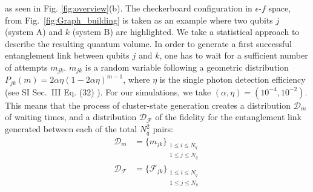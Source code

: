 \documentclass[%
 reprint,
 superscriptaddress,
 amsmath,amssymb,
 aps,
 prx,
]{revtex4-2}
\begin{document}
as seen in Fig. \ref{fig:overview}(b). The checkerboard configuration in $\epsilon$-$f$ space, from Fig.~\ref{fig:Graph_building} is taken as an example where two qubits $j$ (system A) and $k$ (system B) are highlighted. We take a statistical approach to describe the resulting quantum volume. In order to generate a first successful entanglement link between qubits $j$ and $k$, one has to wait for a sufficient number of attempts $m_{jk}$. $m_{jk}$ is a random variable following a geometric distribution $P_{jk}(m) = 2\alpha\eta(1-2\alpha\eta)^{m-1}$, where $\eta$ is the single photon detection efficiency (see SI Sec.~III Eq. (32) \cite{googleSI_Programmable_Quantum_Matter_2025Google}). For our simulations, we take $(\alpha,\eta)=(10^{-4},10^{-2})$. This means that the process of cluster-state generation creates a distribution $\mathcal{D}_{m}$ of waiting times, and a distribution $\mathcal{D}_{\mathcal{F}}$ of the fidelity for the entanglement link generated between each of the total $N_q^2$ pairs:
\begin{equation}
\begin{split}
\mathcal{D}_{m} &= \{m_{jk}\}_{\substack{1 \leq i \leq N_q \\ 1 \leq j \leq N_q}} \\
\mathcal{D}_{\mathcal{F}} &= \{\mathcal{F}_{jk}\}_{\substack{1 \leq i \leq N_q \\ 1 \leq j \leq N_q}}
\end{split}
\end{equation}
\end{document}
